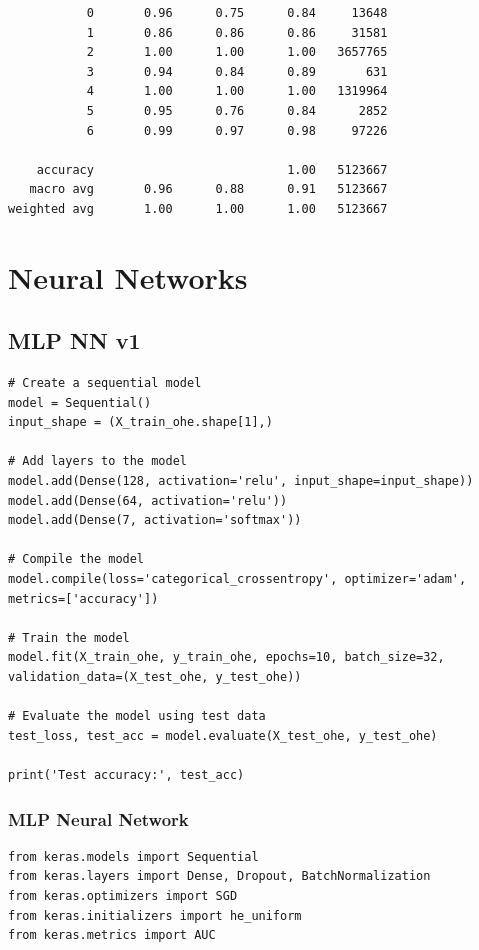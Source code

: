 \begin{appendices}
\begin{lstlisting}
           0       0.96      0.75      0.84     13648
           1       0.86      0.86      0.86     31581
           2       1.00      1.00      1.00   3657765
           3       0.94      0.84      0.89       631
           4       1.00      1.00      1.00   1319964
           5       0.95      0.76      0.84      2852
           6       0.99      0.97      0.98     97226

    accuracy                           1.00   5123667
   macro avg       0.96      0.88      0.91   5123667
weighted avg       1.00      1.00      1.00   5123667
\end{lstlisting}

\newpage


\newpage



\section{Neural Networks}
\label{appx: Neural Networks}

\subsection{MLP NN v1}
\label{appx: MLP NN v1}

\begin{lstlisting}
# Create a sequential model
model = Sequential()
input_shape = (X_train_ohe.shape[1],)

# Add layers to the model
model.add(Dense(128, activation='relu', input_shape=input_shape))
model.add(Dense(64, activation='relu'))
model.add(Dense(7, activation='softmax'))

# Compile the model
model.compile(loss='categorical_crossentropy', optimizer='adam', metrics=['accuracy'])

# Train the model
model.fit(X_train_ohe, y_train_ohe, epochs=10, batch_size=32, validation_data=(X_test_ohe, y_test_ohe))

# Evaluate the model using test data
test_loss, test_acc = model.evaluate(X_test_ohe, y_test_ohe)

print('Test accuracy:', test_acc)
\end{lstlisting}

\subsubsection{MLP Neural Network}
\label{appx: MLP NN}

\begin{lstlisting}
from keras.models import Sequential
from keras.layers import Dense, Dropout, BatchNormalization
from keras.optimizers import SGD
from keras.initializers import he_uniform
from keras.metrics import AUC


\end{lstlisting}
\end{appendices}
